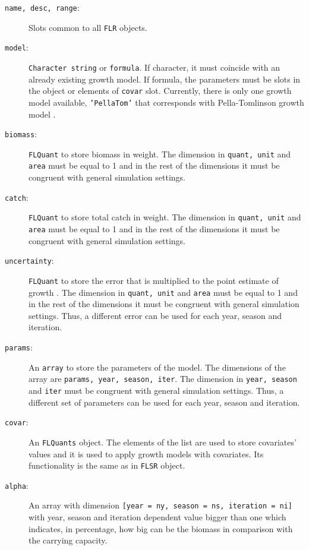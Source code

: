 	
\begin{description}
	\item[\texttt{name, desc, range}:] Slots common to all \texttt{FLR} objects. 
	\item[\texttt{model}:] \texttt{Character string} or \texttt{formula}. If character, it must coincide with an already existing growth model.
			If formula, the parameters must be slots in the object or elements of \texttt{covar} slot. Currently, there is only one 
			growth model available, \texttt{'PellaTom'} that corresponds with Pella-Tomlinson growth model \citep{Pella1969}.					
	\item[\texttt{biomass}:] \texttt{FLQuant} to store biomass in weight. The dimension in \texttt{quant, unit} and \texttt{area}
			must be equal to 1 and in the rest of the dimensions it must be congruent with general simulation settings. 
	\item[\texttt{catch}:] \texttt{FLQuant} to store total catch in weight. The dimension in \texttt{quant, unit} and \texttt{area}
			must be equal to 1 and in the rest of the dimensions it must be congruent with general simulation settings. 
	\item[\texttt{uncertainty}:] \texttt{FLQuant} to store the error that is multiplied to the point estimate of growth . 
			The dimension in \texttt{quant, unit} and \texttt{area}
			must be equal to 1 and in the rest of the dimensions it must be congruent with general simulation settings.
			Thus, a different error can be used for each year, season and iteration. 
	\item[\texttt{params}:] An \texttt{array} to store the parameters of the model. The dimensions of the array are 
			\texttt{params, year, season, iter}. The dimension in  \texttt{year, season} and \texttt{iter} must be 
			congruent with general simulation settings. Thus, a different set of parameters can be used for each year, 
			season and iteration.
	\item[\texttt{covar}:] An \texttt{FLQuants} object. The elements of the list are used to store covariates' values and it is used
			to apply growth models with covariates. Its functionality is the same as in \texttt{FLSR} object.
	\item[\texttt{alpha}:] An array with dimension \texttt{[year = ny, season = ns, iteration = ni]} 
	  with  year, season and iteration dependent value bigger than one which indicates, in percentage, how big can be the biomass in comparison with the carrying capacity.
\end{description}


